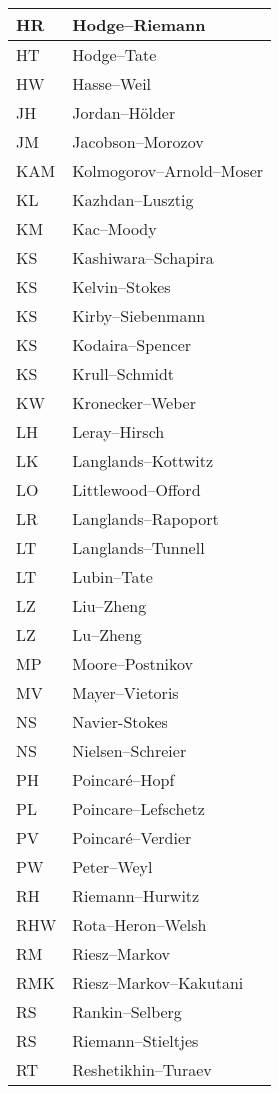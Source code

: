 \documentclass{amsart}
\numberwithin{equation}{section}
\theoremstyle{plain}
\numberwithin{equation}{section}
\theoremstyle{remark}
\begin{document}
\begin{longtable}{l|l}
HR & Hodge--Riemann\\ \hline
HT & Hodge--Tate\\ \hline
HW & Hasse--Weil\\ \hline
JH & Jordan--Hölder\\ \hline
JM & Jacobson--Morozov\\ \hline
KAM & Kolmogorov--Arnold--Moser\\ \hline
KL & Kazhdan--Lusztig \\ \hline
KM & Kac--Moody\\ \hline
KS & Kashiwara--Schapira\\ \hline
KS & Kelvin--Stokes\\ \hline
KS & Kirby--Siebenmann\\ \hline
KS & Kodaira--Spencer\\ \hline
KS & Krull--Schmidt\\ \hline
KW & Kronecker--Weber\\ \hline
LH & Leray--Hirsch\\ \hline
LK & Langlands--Kottwitz\\ \hline
LO & Littlewood--Offord\\ \hline
LR & Langlands--Rapoport\\ \hline
LT & Langlands--Tunnell\\ \hline
LT & Lubin--Tate\\ \hline
LZ & Liu--Zheng\\ \hline
LZ & Lu--Zheng\\ \hline
MP & Moore--Postnikov\\ \hline
MV & Mayer--Vietoris\\ \hline
NS & Navier-Stokes\\ \hline
NS & Nielsen--Schreier\\ \hline
PH & Poincaré--Hopf\\ \hline
PL & Poincare--Lefschetz\\ \hline
PV & Poincaré--Verdier\\ \hline
PW & Peter--Weyl\\ \hline
RH & Riemann--Hurwitz\\ \hline
RHW & Rota--Heron--Welsh\\ \hline
RM & Riesz--Markov\\ \hline
RMK & Riesz--Markov--Kakutani\\ \hline
RS & Rankin--Selberg\\ \hline
RS & Riemann--Stieltjes\\ \hline
RT & Reshetikhin--Turaev\\ \hline

\end{longtable}
\end{document}
